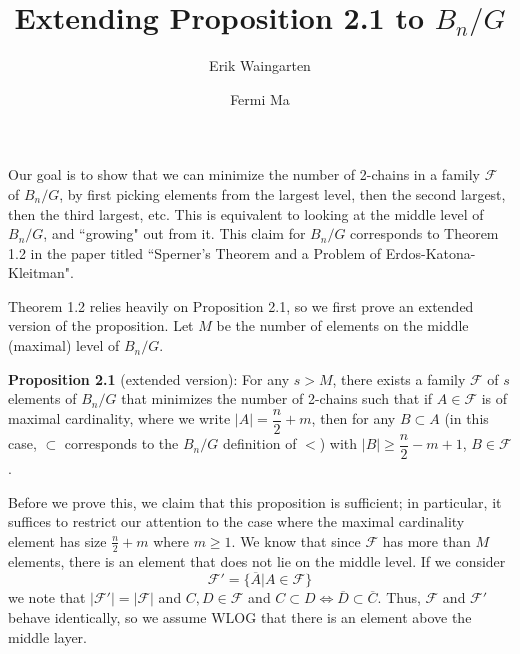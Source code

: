 \documentclass[11pt]{article}
\author{Erik Waingarten \and Fermi Ma}
\title{Extending Proposition 2.1 to $B_n/G$}
\newcommand{\F}{\mathcal{F}}
\begin{document}
         
\maketitle

Our goal is to show that we can minimize the number of 2-chains in a family $\F$ of $B_n/G$, by first picking elements from the largest level, then the second largest, then the third largest, etc. This is equivalent to looking at the middle level of $B_n/G$, and ``growing" out from it. This claim for $B_n/G$ corresponds to Theorem 1.2 in the paper titled ``Sperner's Theorem and a Problem of Erdos-Katona-Kleitman".

Theorem 1.2 relies heavily on Proposition 2.1, so we first prove an extended version of the proposition. Let $M$ be the number of elements on the middle (maximal) level of $B_n/G$. 

\textbf{Proposition 2.1} (extended version): For any $s > M$, there exists a family $\F$ of $s$ elements of $B_n/G$ that minimizes the number of 2-chains such that if $A \in \F$ is of maximal cardinality, where we write $|A| = \dfrac{n}{2} + m$, then for any $B \subset A$ (in this case, $\subset$ corresponds to the $B_n/G$ definition of $<$) with $|B| \geq \dfrac{n}{2} - m + 1$, $B \in \F$.

Before we prove this, we claim that this proposition is sufficient; in particular, it suffices to restrict our attention to the case where the maximal cardinality element has size $\frac{n}{2} + m$ where $m \geq 1$. We know that since $\F$ has more than $M$ elements, there is an element that does not lie on the middle level. If we consider 
\[ \F' = \{ \overline{A} | A \in \F \} \]
we note that $|\F'| = |\F|$ and $C, D \in \F$ and $C \subset D \iff \overline{D} \subset \overline{C}$. Thus, $\F$ and $\F'$ behave identically, so we assume WLOG that there is an element above the middle layer. 

%
\end{document}
